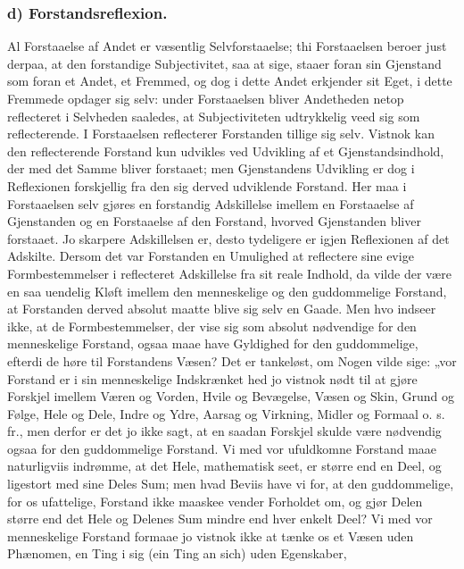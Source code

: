 \documentclass[11pt]{book}
\newcommand{\opage}[1]{\marginnote{\footnotesize\textit{[#1]}}}
\begin{document}
\subsubsection*{d) Forstandsreflexion.}
Al Forstaaelse af Andet er væsentlig Selvforstaaelse; thi Forstaaelsen
beroer just derpaa, at den forstandige Subjectivitet, saa at sige, staaer
foran sin Gjenstand som foran et Andet, et Fremmed, og dog i dette Andet
erkjender sit Eget, i dette Fremmede opdager sig selv: under Forstaaelsen
bliver Andetheden netop reflecteret i Selvheden saaledes, at
Subjectiviteten udtrykkelig veed sig som reflecterende. I Forstaaelsen
reflecterer Forstanden tillige sig selv. Vistnok kan den reflecterende
Forstand kun udvikles ved Udvikling af et Gjenstandsindhold, der med det
Samme bliver forstaaet; men Gjenstandens Udvikling er dog i Reflexionen
forskjellig fra den sig derved udviklende Forstand. Her maa i Forstaaelsen
selv gjøres en forstandig Adskillelse imellem en Forstaaelse af Gjenstanden
og en Forstaaelse af den Forstand, hvorved Gjenstanden bliver forstaaet. Jo
skarpere Adskillelsen er, desto tydeligere er igjen Reflexionen af det
Adskilte. Dersom det var Forstanden en Umulighed at reflectere sine evige
Formbestemmelser i reflecteret Adskillelse fra sit reale Indhold, da vilde
der være en saa uendelig Kløft imellem den menneskelige og den
guddommelige Forstand, at Forstanden derved absolut maatte blive sig selv
en Gaade. Men hvo indseer ikke, at de Formbestemmelser, der vise sig som
absolut nødvendige for den menneskelige Forstand, ogsaa maae have Gyldighed
for den guddommelige, efterdi de høre til Forstandens Væsen? Det er
tankeløst, om Nogen vilde sige: „vor Forstand er i sin menneskelige
Indskrænket\-%
\opage{61} \setcounter{footnote}{0}%
hed jo vistnok nødt til at gjøre Forskjel imellem Væren og Vorden, Hvile og
Bevægelse, Væsen og Skin, Grund og Følge, Hele og Dele, Indre og Ydre,
Aarsag og Virkning, Midler og Formaal o. s. fr., men derfor er det jo ikke
sagt, at en saadan Forskjel skulde være nødvendig ogsaa for den
guddommelige Forstand. Vi med vor ufuldkomne Forstand maae naturligviis
indrømme, at det Hele, mathematisk seet, er større end en Deel, og
ligestort med sine Deles Sum; men hvad Beviis have vi for, at den
guddommelige, for os ufattelige, Forstand ikke maaskee vender Forholdet om,
og gjør Delen større end det Hele og Delenes Sum mindre end hver enkelt
Deel? Vi med vor menneskelige Forstand formaae jo vistnok ikke at tænke os
et Væsen uden Phænomen, en Ting i sig (ein Ting an sich) uden Egenskaber,
\end{document}
